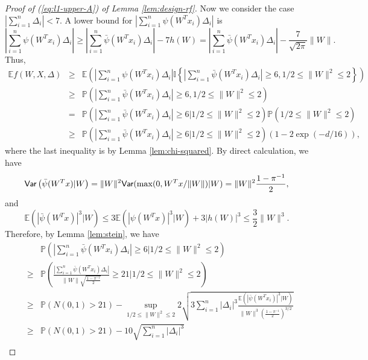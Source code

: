 \begin{proof}[Proof of (\ref{eq:l1-upper-A}) of Lemma \ref{lem:design-rf}]
Now we consider the case $\left|\sum_{i=1}^n\Delta_i\right|< 7$. A lower bound for $\left|\sum_{i=1}^n\psi(W^Tx_i)\Delta_i\right|$ is
\begin{equation}
\left|\sum_{i=1}^n\psi(W^Tx_i)\Delta_i\right| \geq \left|\sum_{i=1}^n\bar{\psi}(W^Tx_i)\Delta_i\right| - 7h(W) = \left|\sum_{i=1}^n\bar{\psi}(W^Tx_i)\Delta_i\right| - \frac{7}{\sqrt{2\pi}}\|W\|. \label{eq:seven}
\end{equation}
Thus,
\begin{eqnarray}
\nonumber \mathbb{E}f(W,X,\Delta) &\geq& \mathbb{E}\left(\left|\sum_{i=1}^n\psi(W^Tx_i)\Delta_i\right|\mathbb{I}\left\{\left|\sum_{i=1}^n\bar{\psi}(W^Tx_i)\Delta_i\right|\geq 6, 1/2\leq \|W\|^2\leq 2\right\}\right) \\
\nonumber &\geq& \mathbb{P}\left(\left|\sum_{i=1}^n\bar{\psi}(W^Tx_i)\Delta_i\right|\geq 6, 1/2\leq \|W\|^2\leq 2\right) \\
\nonumber &=& \mathbb{P}\left(\left|\sum_{i=1}^n\bar{\psi}(W^Tx_i)\Delta_i\right|\geq 6\Big|1/2\leq \|W\|^2\leq 2\right)\mathbb{P}\left(1/2\leq \|W\|^2\leq 2\right) \\
\nonumber &\geq& \mathbb{P}\left(\left|\sum_{i=1}^n\bar{\psi}(W^Tx_i)\Delta_i\right|\geq 6\Big|1/2\leq \|W\|^2\leq 2\right)\left(1-2\exp(-d/16)\right),
\end{eqnarray}
where the last inequality is by Lemma \ref{lem:chi-squared}. By direct calculation, we have
\begin{equation}
\Var\left(\bar{\psi}(W^Tx)|W\right)=\|W\|^2\Var(\max(0,W^Tx/\|W\|)|W)=\|W\|^2\frac{1-\pi^{-1}}{2}, \label{eq:cond-var-X-W}
\end{equation}
and
$$\mathbb{E}\left(|\bar{\psi}(W^Tx)|^3|W\right) \leq 3\mathbb{E}\left(|\psi(W^Tx)|^3|W\right)+3|h(W)|^3 \leq \frac{3}{2}\|W\|^3.$$
Therefore, by Lemma \ref{lem:stein}, we have
\begin{eqnarray}
\nonumber && \mathbb{P}\left(\left|\sum_{i=1}^n\bar{\psi}(W^Tx_i)\Delta_i\right|\geq 6\Big|1/2\leq \|W\|^2\leq 2\right) \\
\nonumber &\geq& \mathbb{P}\left(\frac{\left|\sum_{i=1}^n\bar{\psi}(W^Tx_i)\Delta_i\right|}{\|W\|\sqrt{\frac{1-\pi^{-1}}{2}}}\geq 21\Bigg|1/2\leq \|W\|^2\leq 2\right) \\
\nonumber &\geq& \mathbb{P}\left(N(0,1)>21\right) - \sup_{1/2\leq \|W\|^2\leq 2} 2\sqrt{3\sum_{i=1}^n|\Delta_i|^3\frac{\mathbb{E}\left(|\bar{\psi}(W^Tx_i)|^3|W\right)}{\|W\|^3\left(\frac{1-\pi^{-1}}{2}\right)^{3/2}}} \\
\nonumber &\geq& \mathbb{P}\left(N(0,1)>21\right) - 10\sqrt{\sum_{i=1}^n|\Delta_i|^3} \\

\end{eqnarray}
\end{proof}
